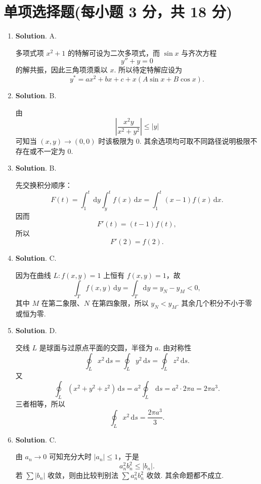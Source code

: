 \documentclass[../Main.tex]{subfiles}
\begin{document}
\section{单项选择题(每小题 3 分，共 18 分)}
\begin{enumerate}
    \item \textbf{Solution}. A.

          多项式项 \(x^2+1\) 的特解可设为二次多项式，而 \(\sin x\) 与齐次方程
          \[
              y''+y=0
          \]
          的解共振，因此三角项须乘以 \(x\). 所以待定特解应设为
          \[
              y^*=ax^2+bx+c+x(A\sin x+B\cos x).
          \]

    \item \textbf{Solution}. B.

          由
          \[
              \left|\frac{x^2y}{x^2+y^2}\right|\le |y|
          \]
          可知当 \((x,y)\to(0,0)\) 时该极限为 \(0\). 其余选项均可取不同路径说明极限不存在或不一定为 \(0\).

    \item \textbf{Solution}. B.

          先交换积分顺序：
          \[
              F(t)=\int_1^t\,\mathrm{d}y\int_y^t f(x)\,\mathrm{d}x=\int_1^t(x-1)f(x)\,\mathrm{d}x.
          \]
          因而
          \[
              F'(t)=(t-1)f(t),
          \]
          所以
          \[
              F'(2)=f(2).
          \]

    \item \textbf{Solution}. C.

          因为在曲线 \(L:f(x,y)=1\) 上恒有 \(f(x,y)=1\)，故
          \[
              \int_T f(x,y)\,\mathrm{d}y=\int_T \mathrm{d}y=y_N-y_M<0,
          \]
          其中 \(M\) 在第二象限、\(N\) 在第四象限，所以 \(y_N<y_M\). 其余几个积分不小于零或恒为零.

    \item \textbf{Solution}. D.

          交线 \(L\) 是球面与过原点平面的交圆，半径为 \(a\). 由对称性
          \[
              \oint_L x^2\,\mathrm{d}s=\oint_L y^2\,\mathrm{d}s=\oint_L z^2\,\mathrm{d}s.
          \]
          又
          \[
              \oint_L(x^2+y^2+z^2)\,\mathrm{d}s=a^2\oint_L\,\mathrm{d}s=a^2\cdot 2\pi a=2\pi a^3.
          \]
          三者相等，所以
          \[
              \oint_L x^2\,\mathrm{d}s=\frac{2\pi a^3}{3}.
          \]

    \item \textbf{Solution}. C.

          由 \(a_n\to 0\) 可知充分大时 \(|a_n|\le 1\)，于是
          \[
              a_n^2b_n^2\le |b_n|.
          \]
          若 \(\sum |b_n|\) 收敛，则由比较判别法 \(\sum a_n^2b_n^2\) 收敛. 其余命题都不成立.
\end{enumerate}
\end{document}
